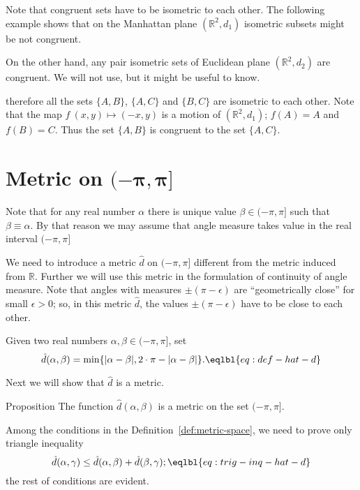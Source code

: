 {Note that congruent sets have to be isometric to each other.
The following example shows that on the Manhattan plane $(\mathbb{R}^2,d_1)$ isometric subsets might be not congruent.

On the other hand,
any pair isometric sets of Euclidean plane $(\mathbb{R}^2,d_2)$ are congruent.
We will not use, but it might be useful to know.



therefore all the sets $\{A,B\}$, $\{A,C\}$ and $\{B,C\}$ are isometric to each other.
Note that the map $f\:(x,y)\mapsto (-x,y)$ is a motion of $(\mathbb{R}^2,d_1)$; 
$f(A)=A$ and $f(B)=C$.
Thus the set $\{A,B\}$ is congruent to the set $\{A,C\}$.









\section*{Metric on $\bm{(-\pi,\pi]}$}
\addtocontents{toc}{Metric on $(-\pi,\pi]$.}

Note that for any real number $\alpha$ there is unique value $\beta\in(-\pi,\pi]$ such that
$\beta\equiv \alpha$.
By that reason we may assume that angle measure takes value in the real interval $(-\pi,\pi]$

We need to introduce a metric $\hat{d}$ on $(-\pi,\pi]$
different from the metric induced from $\mathbb{R}$.
Further we will use this metric in the formulation 
of continuity of angle measure.
Note that angles with measures $\pm(\pi-\epsilon)$ are ``geometrically close'' for small $\epsilon>0$;
so, in this metric $\hat{d}$, the values $\pm(\pi-\epsilon)$ have to be close to each other.

Given two real numbers 
$\alpha,\beta\in (-\pi,\pi]$,
set \label{def:max-dist}
$$\hat{d}(\alpha,\beta)
=
\min\{|\alpha-\beta|,2\cdot\pi-|\alpha-\beta|\}.
\eqlbl{eq:def-hat-d}
$$

Next we will show that $\hat{d}$ is a metric.

\begin{thm}{Proposition}
The function $\hat{d}(\alpha,\beta)$ is a metric on the set $(-\pi,\pi]$.
\end{thm}

Among the conditions in the Definition~\ref{def:metric-space}, we need to prove only triangle inequality
$$\hat{d}(\alpha,\gamma)\le \hat{d}(\alpha,\beta)+\hat{d}(\beta,\gamma);
\eqlbl{eq:trig-inq-hat-d}$$
the rest of conditions are  evident.

}
